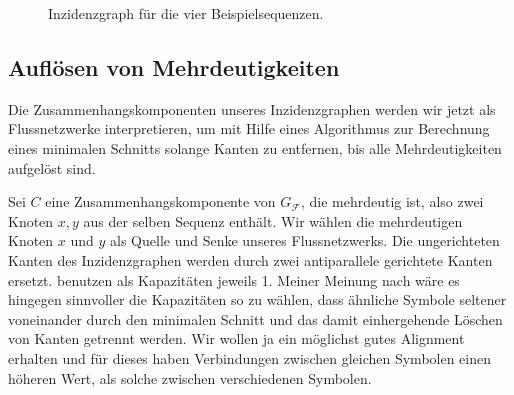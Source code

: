 \begin{figure}
\begin{center}
\end{center}
\caption{Inzidenzgraph für die vier Beispielsequenzen.}\label{bsp:inzidenz}
\end{figure}

\subsection{Auflösen von Mehrdeutigkeiten}

Die Zusammenhangskomponenten unseres Inzidenzgraphen werden wir jetzt als Flussnetzwerke interpretieren, um mit Hilfe eines Algorithmus zur Berechnung eines minimalen Schnitts solange Kanten zu entfernen, bis alle Mehrdeutigkeiten aufgelöst sind.

Sei $C$ eine Zusammenhangskomponente von $G_{\mathcal{F}}$, die mehrdeutig ist, also zwei Knoten $x,y$ aus der selben Sequenz enthält. Wir wählen die mehrdeutigen Knoten $x$ und $y$ als Quelle und Senke unseres Flussnetzwerks. Die ungerichteten Kanten des Inzidenzgraphen werden durch zwei antiparallele gerichtete Kanten ersetzt. \cite{cpm10} benutzen als Kapazitäten jeweils 1. Meiner Meinung nach wäre es hingegen sinnvoller die Kapazitäten so zu wählen, dass ähnliche Symbole seltener voneinander durch den minimalen Schnitt und das damit einhergehende Löschen von Kanten getrennt werden. Wir wollen ja ein möglichst gutes Alignment erhalten und für dieses haben Verbindungen zwischen gleichen Symbolen einen höheren Wert, als solche zwischen verschiedenen Symbolen.

